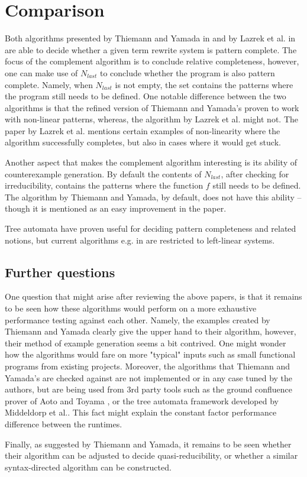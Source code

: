 \section{Comparison} \label{discussion}
Both algorithms presented by Thiemann and Yamada in \cite{thiemann} and by Lazrek et al. in \cite{lazrek} are able to decide whether a given term rewrite system is pattern complete. The focus of the complement algorithm is to conclude relative completeness, however, one can make use of $N_{last}$ to conclude whether the program is also pattern complete. Namely, when $N_{last}$ is not empty, the set contains the patterns where the program still needs to be defined. One notable difference between the two algorithms is that the refined version of Thiemann and Yamada's proven to work with non-linear patterns, whereas, the algorithm by Lazrek et al. might not. The paper by Lazrek et al. mentions certain examples of non-linearity where the algorithm successfully completes, but also in cases where it would get stuck.

Another aspect that makes the complement algorithm interesting is its ability of counterexample generation. By default the contents of $N_{last}$, after checking for irreducibility, contains the patterns where the function $f$ still needs to be defined\cite{lazrek}. The algorithm by Thiemann and Yamada, by default, does not have this ability – though it is mentioned as an easy improvement in the paper\cite{thiemann}.

Tree automata have proven useful for deciding pattern completeness and related notions, but current algorithms e.g. in \cite{middeldorp} are restricted to left-linear systems.

\subsection{Further questions}
One question that might arise after reviewing the above papers, is that it remains to be seen how these algorithms would perform on a more exhaustive performance testing against each other. Namely, the examples created by Thiemann and Yamada clearly give the upper hand to their algorithm\cite{thiemann}, however, their method of example generation seems a bit contrived. One might wonder how the algorithms would fare on more "typical" inputs such as small functional programs from existing projects. Moreover, the algorithms that Thiemann and Yamada's are checked against are not implemented or in any case tuned by the authors, but are being used from 3rd party tools such as the ground confluence prover of Aoto and Toyama \cite{aoto}, or the tree automata framework developed by Middeldorp et al.\cite{middeldorp}. This fact might explain the constant factor performance difference between the runtimes.

Finally, as suggested by Thiemann and Yamada, it remains to be seen whether their algorithm can be adjusted to decide quasi-reducibility, or whether a similar syntax-directed algorithm can be constructed.